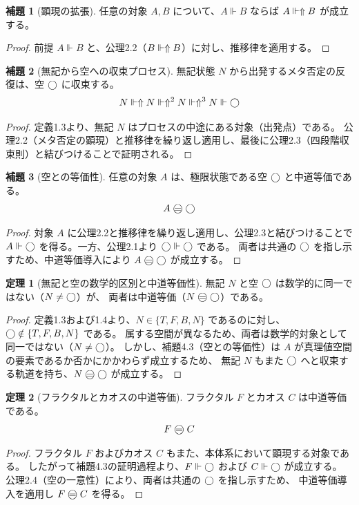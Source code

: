 \documentclass[11pt,a4paper]{article}
\theoremstyle{definition}
\newtheorem{lemma}{補題}[section]
\newtheorem{theorem}{定理}[section]
\newcommand{\aletheiai}{\Vdash} %
\begin{document}
\begin{lemma}[顕現の拡張]
任意の対象 $A, B$ について、$A \aletheiai B$ ならば $A \aletheiai \metanegation B$ が成立する。
\end{lemma}
\begin{proof}
前提 $A \aletheiai B$ と、公理2.2（$B \aletheiai \metanegation B$）に対し、推移律を適用する。
\end{proof}

\begin{lemma}[無記から空への収束プロセス]
無記状態 $N$ から出発するメタ否定の反復は、空 $\bigcirc$ に収束する。
$$N \aletheiai \metanegation N \aletheiai \metanegation^2 N \aletheiai \metanegation^3 N \aletheiai \dfix$$
\end{lemma}
\begin{proof}
定義1.3より、無記 $N$ はプロセスの中途にある対象（出発点）である。
公理2.2（メタ否定の顕現）と推移律を繰り返し適用し、最後に公理2.3（四段階収束則）と結びつけることで証明される。
\end{proof}

\begin{lemma}[空との等価性]
任意の対象 $A$ は、極限状態である空 $\bigcirc$ と中道等価である。
$$A \mweq \dfix$$
\end{lemma}
\begin{proof}
対象 $A$ に公理2.2と推移律を繰り返し適用し、公理2.3と結びつけることで
$A \aletheiai \dfix$ を得る。一方、公理2.1より $\dfix \aletheiai \dfix$ である。
両者は共通の $\bigcirc$ を指し示すため、中道等価導入により $A \mweq \dfix$ が成立する。
\end{proof}

\begin{theorem}[無記と空の数学的区別と中道等価性]
無記 $N$ と空 $\bigcirc$ は数学的に同一ではない（$N \neq \bigcirc$）が、
両者は中道等価（$N \mweq \dfix$）である。
\end{theorem}
\begin{proof}
定義1.3および1.4より、$N \in \{T, F, B, N\}$ であるのに対し、$\bigcirc \notin \{T, F, B, N\}$ である。
属する空間が異なるため、両者は数学的対象として同一ではない（$N \neq \bigcirc$）。
しかし、補題4.3（空との等価性）は $A$ が真理値空間の要素であるか否かにかかわらず成立するため、
無記 $N$ もまた $\bigcirc$ へと収束する軌道を持ち、$N \mweq \dfix$ が成立する。
\end{proof}

\begin{theorem}[フラクタルとカオスの中道等価]
フラクタル $F$ とカオス $C$ は中道等価である。
$$F \mweq C$$
\end{theorem}
\begin{proof}
フラクタル $F$ およびカオス $C$ もまた、本体系において顕現する対象である。
したがって補題4.3の証明過程より、$F \aletheiai \dfix$ および $C \aletheiai \dfix$ が成立する。
公理2.4（空の一意性）により、両者は共通の $\bigcirc$ を指し示すため、
中道等価導入を適用し $F \mweq C$ を得る。
\end{proof}
\end{document}
